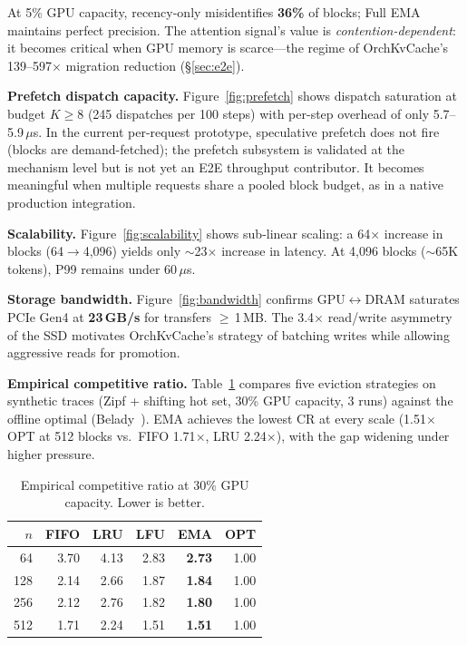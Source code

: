 \documentclass[conference]{IEEEtran}
\begin{document}
At 5\% GPU capacity, recency-only misidentifies \textbf{36\%} of blocks; Full EMA maintains perfect precision. The attention signal's value is \emph{contention-dependent}: it becomes critical when GPU memory is scarce---the regime of OrchKvCache's 139--597$\times$ migration reduction (\S\ref{sec:e2e}).

\textbf{Prefetch dispatch capacity.} Figure~\ref{fig:prefetch} shows dispatch saturation at budget $K \geq 8$ (245 dispatches per 100 steps) with per-step overhead of only 5.7--5.9\,$\mu$s. In the current per-request prototype, speculative prefetch does not fire (blocks are demand-fetched); the prefetch subsystem is validated at the mechanism level but is not yet an E2E throughput contributor. It becomes meaningful when multiple requests share a pooled block budget, as in a native production integration.

\textbf{Scalability.} Figure~\ref{fig:scalability} shows sub-linear scaling: a 64$\times$ increase in blocks (64$\to$4,096) yields only ${\sim}$23$\times$ increase in latency. At 4,096 blocks (${\sim}$65K tokens), P99 remains under 60\,$\mu$s.

\textbf{Storage bandwidth.} Figure~\ref{fig:bandwidth} confirms GPU$\leftrightarrow$DRAM saturates PCIe Gen4 at \textbf{23\,GB/s} for transfers $\geq$\,1\,MB. The 3.4$\times$ read/write asymmetry of the SSD motivates OrchKvCache's strategy of batching writes while allowing aggressive reads for promotion.

\textbf{Empirical competitive ratio.}
\label{sec:competitive-ratio}
Table~\ref{tab:cr} compares five eviction strategies on synthetic traces (Zipf + shifting hot set, 30\% GPU capacity, 3 runs) against the offline optimal (Belady~\cite{sleator-tarjan}). EMA achieves the lowest CR at every scale (1.51$\times$ OPT at 512 blocks vs.\ FIFO 1.71$\times$, LRU 2.24$\times$), with the gap widening under higher pressure.

\begin{table}[t]
\centering
\caption{Empirical competitive ratio at 30\% GPU capacity. Lower is better.}
\label{tab:cr}
\small
\begin{tabular}{@{}rrrrrr@{}}
\toprule
$n$ & FIFO & LRU & LFU & \textbf{EMA} & OPT \\
\midrule
64  & 3.70 & 4.13 & 2.83 & \textbf{2.73} & 1.00 \\
128 & 2.14 & 2.66 & 1.87 & \textbf{1.84} & 1.00 \\
256 & 2.12 & 2.76 & 1.82 & \textbf{1.80} & 1.00 \\
512 & 1.71 & 2.24 & 1.51 & \textbf{1.51} & 1.00 \\
\bottomrule
\end{tabular}
\end{table}
\end{document}
